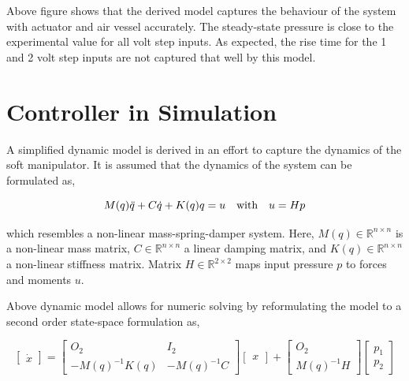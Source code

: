 Above figure shows that the derived model captures the behaviour of the system with actuator and air vessel accurately. The steady-state pressure is close to the experimental value for all volt step inputs. As expected, the rise time for the 1 and 2 volt step inputs are not captured that well by this model.



\section{Controller in Simulation}

A simplified dynamic model is derived in an effort to capture the dynamics of the soft manipulator. It is assumed that the dynamics of the system can be formulated as, 

\begin{equation}
    M(q)\Ddot{q} + C\dot{q} + K(q)q = u \hspace{10pt} \text{with} \hspace{10pt} u = Hp
\end{equation}

which resembles a non-linear mass-spring-damper system. Here, $M(q)  \in \mathbb{R}^{n\times n}$ is a non-linear mass matrix, $C   \in \mathbb{R}^{n\times n}$ a linear damping matrix, and $K(q)   \in \mathbb{R}^{n\times n}$ a non-linear stiffness matrix. Matrix $H   \in \mathbb{R}^{2\times 2}$ maps input pressure $p$ to forces and moments $u$.

Above dynamic model allows for numeric solving by reformulating the model to a second order state-space formulation as,

\begin{equation}
     \begin{bmatrix} \dot{x}  \end{bmatrix}   =      \begin{bmatrix} O_2 & I_2 \\ -M(q)^{-1}K(q)  & -M(q)^{-1} C \end{bmatrix}      \begin{bmatrix} x \end{bmatrix}  +      \begin{bmatrix} O_2 \\ M(q)^{-1}H   \end{bmatrix}       \begin{bmatrix} p_1\\ p_2   \end{bmatrix} 
\end{equation}

